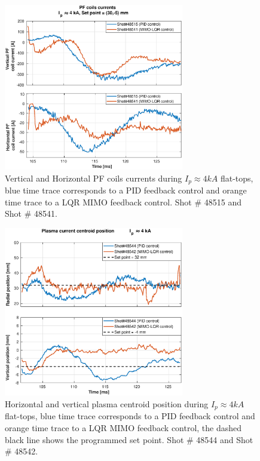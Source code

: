 \begin{figure}
	\centering
	\includegraphics[width=0.7\textwidth]{Chp5/PIDvsMIMO_515_541_curr_2.eps}
	\caption{   Vertical and Horizontal PF coils currents during  $I_p\approx 4kA$  flat-tops, blue time trace corresponds to a PID feedback control and orange time trace to a LQR MIMO feedback control. Shot $\#$ 48515 and Shot $\#$ 48541.}
\end{figure}

\begin{figure}
	\centering
	\includegraphics[width=0.7\textwidth]{Chp5/PIDvsMIMO_544_542_2.eps}
	\caption{Horizontal and vertical plasma centroid position during  $I_p\approx 4kA$  flat-tops, blue time trace corresponds to a PID feedback control and orange time trace to a LQR MIMO feedback control, the dashed black line shows the programmed set point.   Shot $\#$ 48544 and Shot $\#$ 48542.}
\end{figure}

